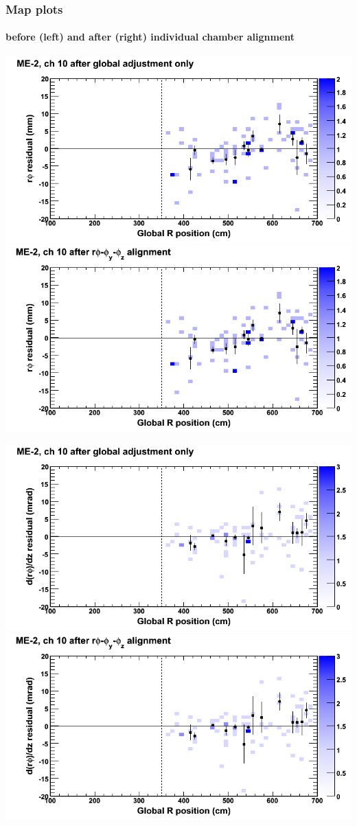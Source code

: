 \documentclass[compress]{beamer}
\begin{document}
\begin{frame}
\frametitle{Map plots}
\framesubtitle{before (left) and after (right) individual chamber alignment}
\includegraphics[width=0.5\linewidth]{ringmapplots_3dof/before_CSCvsr_mem2ch10_x.png} \includegraphics[width=0.5\linewidth]{ringmapplots_3dof/after_CSCvsr_mem2ch10_x.png}

\includegraphics[width=0.5\linewidth]{ringmapplots_3dof/before_CSCvsr_mem2ch10_dxdz.png} \includegraphics[width=0.5\linewidth]{ringmapplots_3dof/after_CSCvsr_mem2ch10_dxdz.png}
\end{frame}
\end{document}
